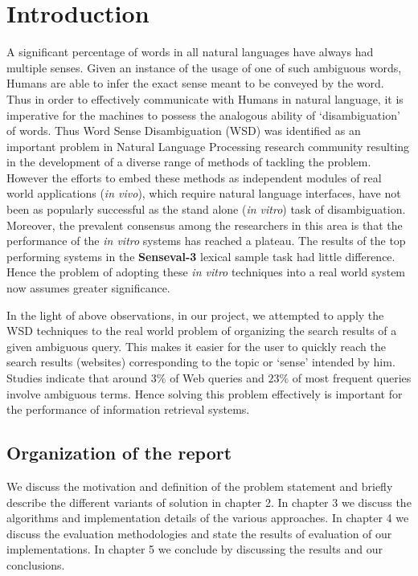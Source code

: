 \documentclass[a4paper,12pt]{report}
\begin{document}
\chapter{Introduction}
A significant percentage of words in all natural languages have always
had multiple senses. Given an instance of the usage of one of such
ambiguous words, Humans are able to infer the exact sense meant to be
conveyed by the word. Thus in order to effectively communicate with
Humans in natural language, it is imperative for the machines to
possess the analogous ability of `disambiguation' of words. Thus Word
Sense Disambiguation (WSD) was identified as an important problem in
Natural Language Processing research community resulting in the
development of a diverse range of methods of tackling the
problem. However the efforts to embed these methods as independent
modules of real world applications ({\it in vivo}), which require
natural language interfaces, have not been as popularly successful as
the stand alone ({\it in vitro}) task of disambiguation. Moreover, the
prevalent consensus among the researchers in this area is that the
performance of the {\it in vitro} systems has reached a plateau. The
results of the top performing systems in the {\bf Senseval-3} lexical
sample task had little difference.\cite{chap4WSD} Hence the problem of
adopting these {\it in vitro} techniques into a real world system now
assumes greater significance.

In the light of above observations, in our project, we attempted to
apply the WSD techniques to the real world problem of organizing the
search results of a given ambiguous query. This makes it easier for
the user to quickly reach the search results (websites) corresponding
to the topic or `sense' intended by him. Studies indicate that around
$3\%$ of Web queries and $23\%$ of most frequent queries involve
ambiguous terms\cite{miller}. Hence solving this problem effectively
is important for the performance of information retrieval systems.
\section{Organization of the report}
We discuss the motivation and definition of the problem statement and
briefly describe the different variants of solution in chapter 2. In
chapter 3 we discuss the algorithms and implementation details of the
various approaches. In chapter 4 we discuss the evaluation methodologies
and state the results of evaluation of our implementations. In chapter
5 we conclude by discussing the results and our conclusions.
\end{document}
